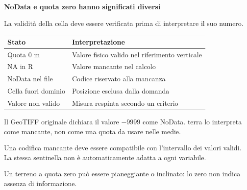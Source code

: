 \documentclass[12pt,aspectratio=1610]{beamer}
\newcommand{\PBody}[1]{\par{\fontsize{11.3}{14.8}\selectfont #1\par}}
\newcommand{\PSmall}[1]{\par{\fontsize{9.8}{13.1}\selectfont #1\par}}
\newcommand{\PInfo}[1]{%
\begin{tcolorbox}[enhanced,arc=1.6mm,boxrule=.55pt,colback=GeoTint,
 colframe=Rule!80!Classical,left=2.3mm,right=2.3mm,top=2mm,bottom=2mm,
 before skip=1mm,after skip=1mm]
\PSmall{#1}\end{tcolorbox}}
\begin{document}
\begin{frame}[plain]\hypertarget{slide21}{}
\begin{lrbox}{\TitleBox}
\begin{minipage}[t]{17.7cm}\raggedright\color{Ink}\fontsize{11.3}{14.8}\selectfont
\color{Navy}\bfseries\fontsize{20.6}{24.5}\selectfont NoData e quota zero hanno significati diversi
\end{minipage}\end{lrbox}

\begin{lrbox}{\RecallBox}
\begin{minipage}[t]{14.3cm}\raggedright\color{Ink}\fontsize{11.3}{14.8}\selectfont
\fontsize{10.3}{13.8}\selectfont La validità della cella deve essere verificata prima di interpretare il suo numero.
\end{minipage}\end{lrbox}

\begin{lrbox}{\PilotLeftBox}
\begin{minipage}[t]{10.05cm}\raggedright\color{Ink}\fontsize{11.3}{14.8}\selectfont
{\fontsize{10.2}{13.1}\selectfont\renewcommand{\arraystretch}{1.45}\begin{tabular}{@{}p{4.0cm}p{5.0cm}@{}}\toprule
\textbf{Stato} & \textbf{Interpretazione}\\\midrule
Quota 0 m & Valore fisico valido nel riferimento verticale\\
NA in R & Valore mancante nel calcolo\\
NoData nel file & Codice riservato alla mancanza\\
Cella fuori dominio & Posizione esclusa dalla domanda\\
Valore non valido & Misura respinta secondo un criterio\\
\bottomrule\end{tabular}}

\end{minipage}\end{lrbox}

\begin{lrbox}{\PilotRightBox}
\begin{minipage}[t]{7.55cm}\raggedright\color{Ink}\fontsize{11.3}{14.8}\selectfont
\PBody{Il GeoTIFF originale dichiara il valore $-9999$ come NoData. terra lo interpreta come mancante, non come una quota da usare nelle medie.}
\vspace{2.5mm}
\PInfo{Una codifica mancante deve essere compatibile con l’intervallo dei valori validi. La stessa sentinella non è automaticamente adatta a ogni variabile.}
\PBody{Un terreno a quota zero può essere pianeggiante o inclinato: lo zero non indica assenza di informazione.}
\vspace{2.5mm}


\end{minipage}
\end{lrbox}
\end{frame}
\end{document}
